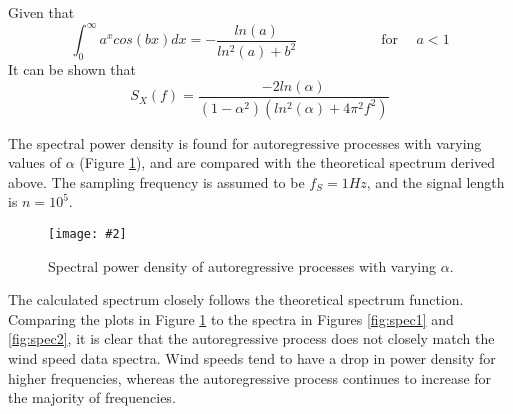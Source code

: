 \documentclass[11pt]{article}
\newcommand{\myFigure}[4][0.8]{
\begin{figure}[H] 

	\centering
	\setlength\fboxsep{1pt}
	\setlength\fboxrule{0.5pt}
	\texttt{[image: \#2]}
	\caption{\small #3}
	\label{#4}
\end{figure}
}
\begin{document}
Given that
$$\int_0^\infty a^xcos(bx)dx = -\frac{ln(a)}{ln^2(a)+b^2} \qquad \qquad \qquad \text{for }\quad a<1$$
It can be shown that
$$S_X(f) = \frac{-2ln(\alpha)}{(1-\alpha^2)(ln^2(\alpha) + 4\pi^2f^2)}$$

The spectral power density is found for autoregressive processes with varying values of $\alpha$ (Figure \ref{fig:spec3}), and are compared with the theoretical spectrum derived above. The sampling frequency is assumed to be $f_S = 1Hz$, and the signal length is $n=10^5$.

\myFigure[0.95]{Figures/figSpec3}{Spectral power density of autoregressive processes with varying $\alpha$.}{fig:spec3}

The calculated spectrum closely follows the theoretical spectrum function. Comparing the plots in Figure \ref{fig:spec3} to the spectra in Figures \ref{fig:spec1} and \ref{fig:spec2}, it is clear that the autoregressive process does not closely match the wind speed data spectra. Wind speeds tend to have a drop in power density for higher frequencies, whereas the autoregressive process continues to increase for the majority of frequencies. 
\end{document}
